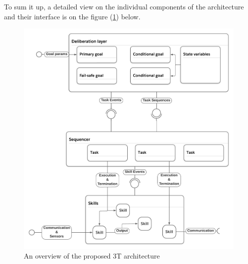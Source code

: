 \documentclass[main.tex]{subfiles}
\begin{document}
To sum it up, a detailed view on the individual components of the architecture and their
interface is on the figure (\ref{arch-proposal}) below.

\begin{figure}[htbp]
    \centering
    \includegraphics[width=.8\textwidth]{architecture-proposal.png}
    \caption{An overview of the proposed 3T architecture}
    \label{arch-proposal}
\end{figure}

\end{document}
